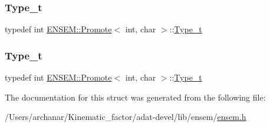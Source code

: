 \subsubsection{\texorpdfstring{Type\_t}{Type\_t}\hspace{0.1cm}{\footnotesize\ttfamily [2/3]}}
{\footnotesize\ttfamily typedef int \mbox{\hyperlink{structENSEM_1_1Promote}{E\+N\+S\+E\+M\+::\+Promote}}$<$ int, char $>$\+::\mbox{\hyperlink{structENSEM_1_1Promote_3_01int_00_01char_01_4_ac6a88a37a5f3bfdba13f61e4c901e8e0}{Type\+\_\+t}}}

\mbox{\label{structENSEM_1_1Promote_3_01int_00_01char_01_4_ac6a88a37a5f3bfdba13f61e4c901e8e0}} 
\subsubsection{\texorpdfstring{Type\_t}{Type\_t}\hspace{0.1cm}{\footnotesize\ttfamily [3/3]}}
{\footnotesize\ttfamily typedef int \mbox{\hyperlink{structENSEM_1_1Promote}{E\+N\+S\+E\+M\+::\+Promote}}$<$ int, char $>$\+::\mbox{\hyperlink{structENSEM_1_1Promote_3_01int_00_01char_01_4_ac6a88a37a5f3bfdba13f61e4c901e8e0}{Type\+\_\+t}}}



The documentation for this struct was generated from the following file\+:\begin{DoxyCompactItemize}
\item 
/\+Users/archanar/\+Kinematic\+\_\+factor/adat-\/devel/lib/ensem/\mbox{\hyperlink{adat-devel_2lib_2ensem_2ensem_8h}{ensem.\+h}}\end{DoxyCompactItemize}

